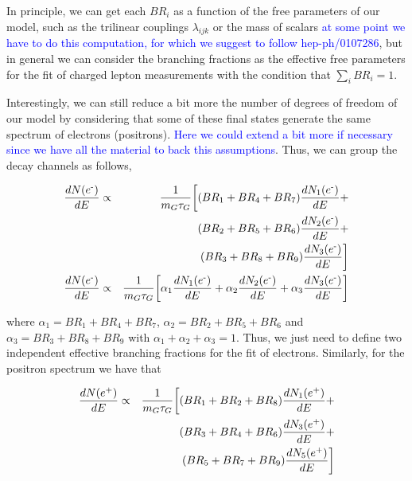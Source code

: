 \documentclass[a4paper,11pt]{article}
\newcommand*{\blue}{\textcolor{blue}}
\begin{document}
In principle, we can get each $BR_{i}$ as a function of the free parameters of our model, such as the trilinear couplings $\lambda_{ijk}$
or the mass of scalars \blue{at some point we have to do this computation, for which we suggest to follow hep-ph/0107286}, but in general we
can consider the branching fractions as the effective free parameters for the fit of charged lepton measurements with the condition that
$\sum_{i}BR_{i}=1$. 

Interestingly, we can still reduce a bit more the number of degrees of freedom of our model by considering that some of these final states generate the same spectrum of electrons (positrons). \blue{Here we could extend a bit more if necessary since we have all the material to back this assumptions}. Thus, we can group the decay channels as follows, 

\begin{eqnarray*}
\frac{dN(e\text{\textsuperscript{-}})}{dE} & \propto & \frac{1}{m_{G}\tau_{G}}\biggl[(BR_{1}+BR_{4}+BR_{7})\frac{dN_{1}(e\text{\textsuperscript{-}})}{dE}+\\
 &  & (BR_{2}+BR_{5}+BR_{6})\frac{dN_{2}(e\text{\textsuperscript{-}})}{dE}+\\
 &  & (BR_{3}+BR_{8}+BR_{9})\frac{dN_{3}(e\text{\textsuperscript{-}})}{dE}\biggr]\\
\frac{dN(e\text{\textsuperscript{-}})}{dE} & \propto & \frac{1}{m_{G}\tau_{G}}\biggl[\alpha_{1}\frac{dN_{1}(e\text{\textsuperscript{-}})}{dE}+\alpha_{2}\frac{dN_{2}(e\text{\textsuperscript{-}})}{dE}+\alpha_{3}\frac{dN_{3}(e\text{\textsuperscript{-}})}{dE}\biggr]
\end{eqnarray*}


\noindent where $\alpha_{1}=BR{}_{1}+BR_{4}+BR_{7}$, $\alpha_{2}=BR{}_{2}+BR_{5}+BR_{6}$
and $\alpha_{3}=BR{}_{3}+BR_{8}+BR_{9}$ with $\alpha_{1}+\alpha_{2}+\alpha_{3}=1$.
Thus, we just need to define two independent effective branching fractions
for the fit of electrons. Similarly, for the positron spectrum we
have that

\begin{eqnarray*}
\frac{dN(e\text{\textsuperscript{+}})}{dE} & \propto & \frac{1}{m_{G}\tau_{G}}\biggl[(BR_{1}+BR_{2}+BR_{8})\frac{dN_{1}(e\text{\textsuperscript{+}})}{dE}+\\
 &  & (BR_{3}+BR_{4}+BR_{6})\frac{dN_{3}(e\text{\textsuperscript{+}})}{dE}+\\
 &  & (BR_{5}+BR_{7}+BR_{9})\frac{dN_{5}(e\text{\textsuperscript{+}})}{dE}\biggr]
\end{eqnarray*}
\end{document}
